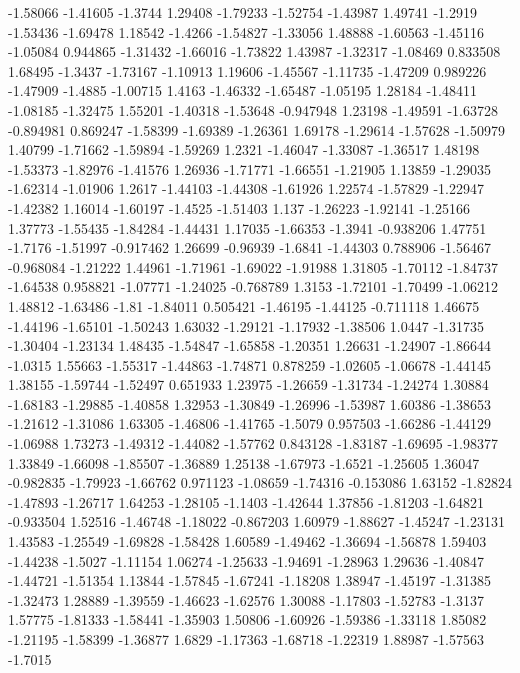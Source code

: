 \documentclass[9pt]{article}
\theoremstyle{plain}
\theoremstyle{definition}
\theoremstyle{remark}
\numberwithin{equation}{section}
\begin{document}
-1.58066
-1.41605
-1.3744
1.29408
-1.79233
-1.52754
-1.43987
1.49741
-1.2919
-1.53436
-1.69478
1.18542
-1.4266
-1.54827
-1.33056
1.48888
-1.60563
-1.45116
-1.05084
0.944865
-1.31432
-1.66016
-1.73822
1.43987
-1.32317
-1.08469
0.833508
1.68495
-1.3437
-1.73167
-1.10913
1.19606
-1.45567
-1.11735
-1.47209
0.989226
-1.47909
-1.4885
-1.00715
1.4163
-1.46332
-1.65487
-1.05195
1.28184
-1.48411
-1.08185
-1.32475
1.55201
-1.40318
-1.53648
-0.947948
1.23198
-1.49591
-1.63728
-0.894981
0.869247
-1.58399
-1.69389
-1.26361
1.69178
-1.29614
-1.57628
-1.50979
1.40799
-1.71662
-1.59894
-1.59269
1.2321
-1.46047
-1.33087
-1.36517
1.48198
-1.53373
-1.82976
-1.41576
1.26936
-1.71771
-1.66551
-1.21905
1.13859
-1.29035
-1.62314
-1.01906
1.2617
-1.44103
-1.44308
-1.61926
1.22574
-1.57829
-1.22947
-1.42382
1.16014
-1.60197
-1.4525
-1.51403
1.137
-1.26223
-1.92141
-1.25166
1.37773
-1.55435
-1.84284
-1.44431
1.17035
-1.66353
-1.3941
-0.938206
1.47751
-1.7176
-1.51997
-0.917462
1.26699
-0.96939
-1.6841
-1.44303
0.788906
-1.56467
-0.968084
-1.21222
1.44961
-1.71961
-1.69022
-1.91988
1.31805
-1.70112
-1.84737
-1.64538
0.958821
-1.07771
-1.24025
-0.768789
1.3153
-1.72101
-1.70499
-1.06212
1.48812
-1.63486
-1.81
-1.84011
0.505421
-1.46195
-1.44125
-0.711118
1.46675
-1.44196
-1.65101
-1.50243
1.63032
-1.29121
-1.17932
-1.38506
1.0447
-1.31735
-1.30404
-1.23134
1.48435
-1.54847
-1.65858
-1.20351
1.26631
-1.24907
-1.86644
-1.0315
1.55663
-1.55317
-1.44863
-1.74871
0.878259
-1.02605
-1.06678
-1.44145
1.38155
-1.59744
-1.52497
0.651933
1.23975
-1.26659
-1.31734
-1.24274
1.30884
-1.68183
-1.29885
-1.40858
1.32953
-1.30849
-1.26996
-1.53987
1.60386
-1.38653
-1.21612
-1.31086
1.63305
-1.46806
-1.41765
-1.5079
0.957503
-1.66286
-1.44129
-1.06988
1.73273
-1.49312
-1.44082
-1.57762
0.843128
-1.83187
-1.69695
-1.98377
1.33849
-1.66098
-1.85507
-1.36889
1.25138
-1.67973
-1.6521
-1.25605
1.36047
-0.982835
-1.79923
-1.66762
0.971123
-1.08659
-1.74316
-0.153086
1.63152
-1.82824
-1.47893
-1.26717
1.64253
-1.28105
-1.1403
-1.42644
1.37856
-1.81203
-1.64821
-0.933504
1.52516
-1.46748
-1.18022
-0.867203
1.60979
-1.88627
-1.45247
-1.23131
1.43583
-1.25549
-1.69828
-1.58428
1.60589
-1.49462
-1.36694
-1.56878
1.59403
-1.44238
-1.5027
-1.11154
1.06274
-1.25633
-1.94691
-1.28963
1.29636
-1.40847
-1.44721
-1.51354
1.13844
-1.57845
-1.67241
-1.18208
1.38947
-1.45197
-1.31385
-1.32473
1.28889
-1.39559
-1.46623
-1.62576
1.30088
-1.17803
-1.52783
-1.3137
1.57775
-1.81333
-1.58441
-1.35903
1.50806
-1.60926
-1.59386
-1.33118
1.85082
-1.21195
-1.58399
-1.36877
1.6829
-1.17363
-1.68718
-1.22319
1.88987
-1.57563
-1.7015
\end{document}
